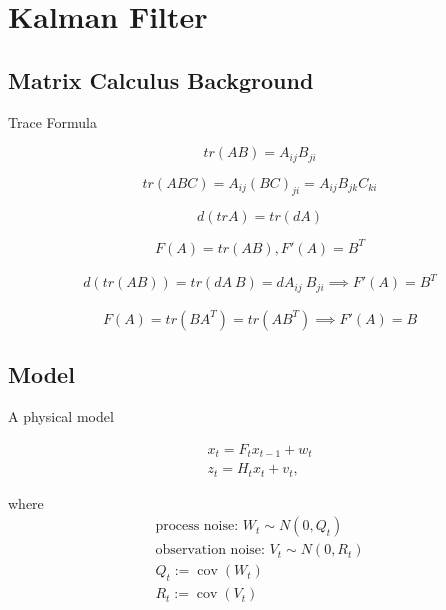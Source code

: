 \documentclass{article}
\newcommand{\cov}{\operatorname{cov}}
\begin{document}
\section{Kalman Filter}

\subsection{Matrix Calculus Background}

Trace Formula

\begin{equation*}
  tr(AB) = A_{ij}B_{ji}
\end{equation*}

\begin{equation*}
  tr(ABC) = A_{ij}(BC)_{ji} = A_{ij}B_{jk}C_{ki}
\end{equation*}

\begin{equation*}
  d(tr A) = tr(dA)
\end{equation*}

\begin{equation*}
  F(A) = tr(AB), F'(A) = B^{T}
\end{equation*}

\begin{align*}
  d(tr(AB)) = tr(dA\ B) = dA_{ij}\ B_{ji}
  \implies F'(A) = B^T
\end{align*}

\begin{equation*}
  F(A) = tr(BA^{T}) = tr(AB^{T}) \implies F'(A) = B
\end{equation*}

\subsection{Model}

A physical model

\begin{align*}
  x_{t} = F_{t} x_{t-1} + w_{t} \\
  z_{t} = H_{t} x_{t} + v_{t}
,\end{align*}

where
\begin{align*}
  \text{process noise: } W_{t} \sim N(0, Q_{t}) \\
  \text{observation noise: } V_{t} \sim N(0, R_{t})\\
  Q_{t} := \cov(W_{t}) \\
  R_{t} := \cov(V_{t})
\end{align*}
\end{document}
